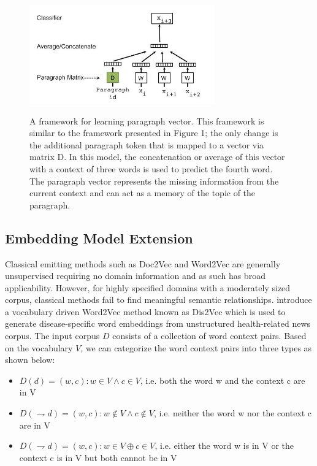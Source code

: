 \documentclass[12pt,a4paper] {article}
\begin{document}
	
	\begin{figure}[h]
		\centering
		\includegraphics[width=8cm, height=5cm]{para}
		\caption[]{A framework for learning paragraph vector. This framework
			is similar to the framework presented in Figure 1; the only
			change is the additional paragraph token that is mapped to a vector
			via matrix D. In this model, the concatenation or average of
			this vector with a context of three words is used to predict the
			fourth word. The paragraph vector represents the missing information
			from the current context and can act as a memory of the
			topic of the paragraph.}
		\label{fig:doc2vec model}
	\end{figure}
	
	\subsection*{Embedding Model Extension}
	
	Classical emitting methods such as Doc2Vec and Word2Vec are generally unsupervised requiring no domain information and as such has broad
	applicability. However, for highly specified domains with a moderately sized corpus, classical methods fail to find meaningful semantic relationships. 
	\cite{ghosh2016characterizing} introduce a vocabulary driven Word2Vec method known as Dis2Vec which is used to generate disease-specific word embeddings from unstructured health-related news corpus. The input corpus $D$ consists of a collection of word context pairs. Based on the vocabulary $ V$, we can categorize the word context pairs into three types as shown
	below:
	\\
	\begin{itemize}
		\item $ D(d) = {(w, c): w \in V ∧c \in V }$, i.e. both the word w and the context c are in V
		\item $D(\rightharpoondown d) = {(w, c): w \notin V ∧c \notin V }$, i.e. neither the word w nor the context c are in V
		\item $D(\rightharpoondown d) = {(w, c): w \in V \oplus c \in V }$, i.e. either the word w is in V or the context c is in V but both cannot be in V
	\end{itemize}
	
\end{document}
